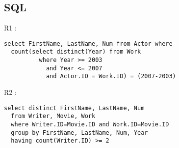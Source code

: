 \documentclass[a4paper,12pt]{article}
\begin{document}
\subsection{SQL}
\begin{list}{-}{}
  \item R1 :
    \begin{lstlisting}
select FirstName, LastName, Num from Actor where
  count(select distinct(Year) from Work
          where Year >= 2003 
            and Year <= 2007
            and Actor.ID = Work.ID) = (2007-2003)

    \end{lstlisting}
  \item R2 :
    \begin{lstlisting}
select distinct FirstName, LastName, Num
  from Writer, Movie, Work
  where Writer.ID=Movie.ID and Work.ID=Movie.ID
  group by FirstName, LastName, Num, Year
  having count(Writer.ID) >= 2
    

\end{lstlisting}
\end{list}
\end{document}
